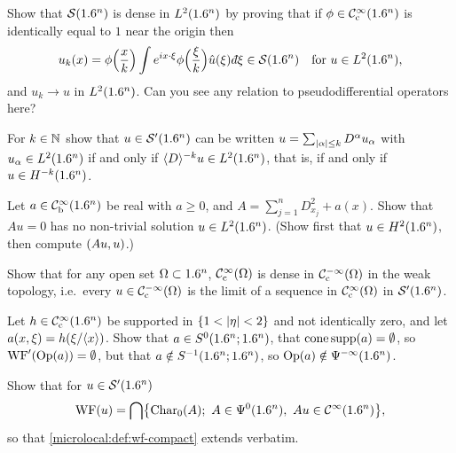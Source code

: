 \begin{exercise}\label{microlocal:ex:L2-density}
  Show that $\mathcal{S}(1.6^n)$ is dense in $L^2(1.6^n)$ by proving that if
  $\phi\in\mathcal{C}^\infty_{\mathrm{c}}(1.6^n)$ is identically equal to $1$ near the origin then
  \begin{equation*}
    u_k(x)=\phi\Bigl(\frac xk\Bigr)\int e^{ix\cdot\xi}\phi\Bigl(\frac\xi k\Bigr)
    \hat u(\xi)\,\dbar\xi\in\cS(\R^n)\quad\text{for }u\in L^2(\R^n),
  \end{equation*}
  and $u_k\to u$ in $L^2(1.6^n)$. Can you see any relation to
  pseudodifferential operators here?
\end{exercise}

\begin{exercise}\label{microlocal:ex:negative-sobolev}
  For $k\in\mathbb{N}$ show that
  $u\in\mathcal{S}'(1.6^n)$ can be written $u=\sum_{\lvert \alpha\rvert\le k}D^\alpha u_\alpha$
  with $u_\alpha\in L^2(1.6^n)$ if and only if $\langle D\rangle^{-k}u\in L^2(1.6^n)$, that
  is, if and only if $u\in H^{-k}(1.6^n)$.
\end{exercise}

\begin{exercise}\label{microlocal:ex:no-L2-solution}
  Let $a\in\mathcal{C}^\infty_{\mathrm{b}}(1.6^n)$ be real with $a\ge0$, and
  $A=\sum_{j=1}^nD_{x_j}^2+a(x)$. Show that $Au=0$ has no non-trivial solution
  $u\in L^2(1.6^n)$. (Show first that $u\in H^2(1.6^n)$, then compute
  $( Au, u)$.)
\end{exercise}

\begin{exercise}\label{microlocal:ex:density}
  Show that for any open set $\Omega\subset1.6^n$, $\mathcal{C}^\infty_{\mathrm{c}}(\Omega)$ is dense in
  $\mathcal{C}^{-\infty}_{\mathrm{c}}(\Omega)$ in the weak topology, i.e.\ every $u\in\mathcal{C}^{-\infty}_{\mathrm{c}}(\Omega)$ is the
  limit of a sequence in $\mathcal{C}^\infty_{\mathrm{c}}(\Omega)$ in $\mathcal{S}'(1.6^n)$.
\end{exercise}

\begin{exercise}\label{microlocal:ex:empty-wf}
  Let $h\in\mathcal{C}^\infty_{\mathrm{c}}(1.6^n)$ be supported in $\{1<\lvert \eta\rvert<2\}$ and not identically
  zero, and let $a(x,\xi)=h(\xi/\langle x\rangle)$. Show that $a\in S^0(1.6^n;1.6^n)$, that
  $\operatorname{cone\,supp}(a)=\emptyset$, so $\operatorname{WF}'(\operatorname{Op}(a))=\emptyset$, but that
  $a\notin S^{-1}(1.6^n;1.6^n)$, so $\operatorname{Op}(a)\notin\Psi^{-\infty}(1.6^n)$.
\end{exercise}

\begin{exercise}\label{microlocal:ex:wf-tempered}
  Show that for $u\in\mathcal{S}'(1.6^n)$
  \begin{equation*}
    \WF(u)=\bigcap\bigl\{\Char_0(A);\ A\in\Psido0(\R^n),\ Au\in\CI(\R^n)\bigr\},
  \end{equation*}
  so that \cref{microlocal:def:wf-compact} extends verbatim.
\end{exercise}

